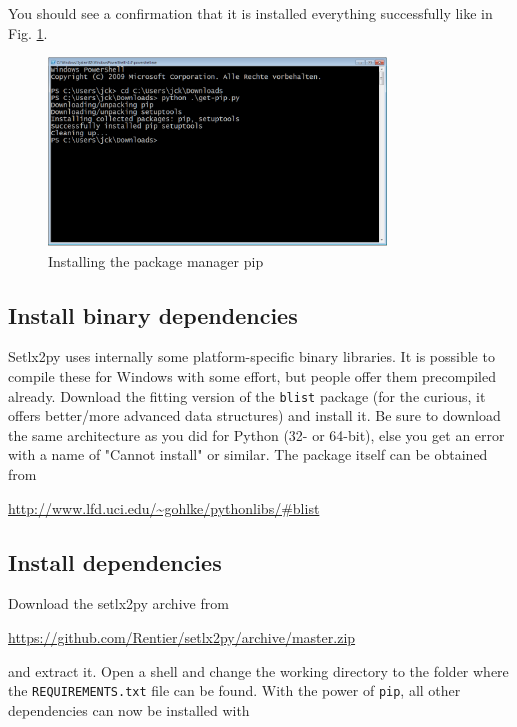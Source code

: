 You should see a confirmation that it is installed everything successfully like in Fig. \ref{fig:install-pip}.

\begin{figure}[ht]
    \centering
    \includegraphics[width=0.8\textwidth]{img/install-pip.png}    
    \caption{Installing the package manager pip}
    \label{fig:install-pip}    
\end{figure}

\subsection{Install binary dependencies}

Setlx2py uses internally some platform-specific binary libraries. It is possible to compile these for Windows with some effort, but people offer them precompiled already. Download the fitting version of the \texttt{blist} package (for the curious, it offers better/more advanced data structures) and install it. Be sure to download the same architecture as you did for Python (32- or 64-bit), else you get an error with a name of "Cannot install" or similar. The package itself can be obtained from

\url{http://www.lfd.uci.edu/~gohlke/pythonlibs/#blist}

\subsection{Install dependencies}

Download the setlx2py archive from 

\url{https://github.com/Rentier/setlx2py/archive/master.zip}

and extract it. Open a shell and change the working directory to the folder where the \texttt{REQUIREMENTS.txt} file can be found. With the power of \texttt{pip}, all other dependencies can now be installed with 

